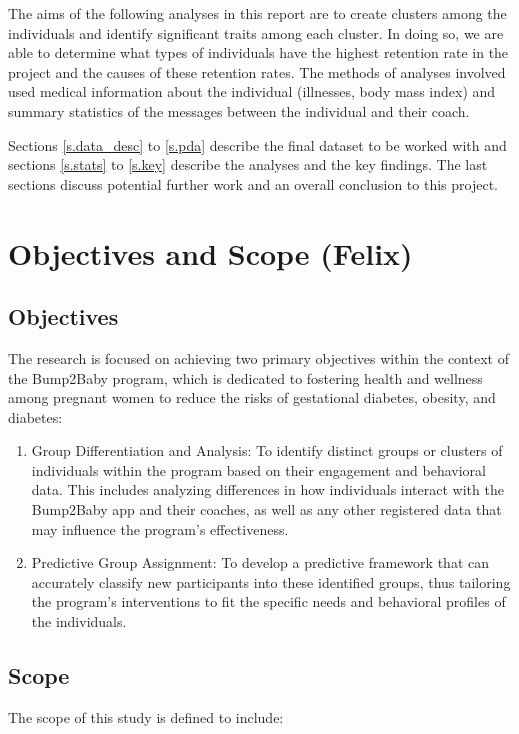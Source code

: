 \documentclass[12pt]{article}
\begin{document}
		The aims of the following analyses in this report are to create clusters among the individuals and identify significant traits among each cluster. In doing so, we are able to determine what types of individuals have the highest retention rate in the project and the causes of these retention rates. The methods of analyses involved used medical information about the individual (illnesses, body mass index) and summary statistics of the messages between the individual and their coach.
		
		Sections \ref{s.data_desc} to \ref{s.pda} describe the final dataset to be worked with and sections \ref{s.stats} to \ref{s.key} describe the analyses and the key findings. The last sections discuss potential further work and an overall conclusion to this project.

\section{Objectives and Scope (Felix)}

\label{s.obj&s}

\subsection{Objectives}
The research is focused on achieving two primary objectives within the context of the Bump2Baby program, which is dedicated to fostering health and wellness among pregnant women to reduce the risks of gestational diabetes, obesity, and diabetes:

\begin{enumerate}
\item Group Differentiation and Analysis: To identify distinct groups or clusters of individuals within the program based on their engagement and behavioral data. This includes analyzing differences in how individuals interact with the Bump2Baby app and their coaches, as well as any other registered data that may influence the program's effectiveness.

\item Predictive Group Assignment: To develop a predictive framework that can accurately classify new participants into these identified groups, thus tailoring the program's interventions to fit the specific needs and behavioral profiles of the individuals.
\end{enumerate}

\subsection{Scope}
The scope of this study is defined to include:
\end{document}
